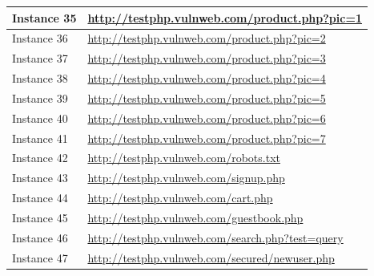 \documentclass[12pt]{article}
\begin{document}
\begin{center}
\begin{longtable}{|l|p{10cm}|}
\hline
Instance 35 & \url{http://testphp.vulnweb.com/product.php?pic=1} \\
\hline
Instance 36 & \url{http://testphp.vulnweb.com/product.php?pic=2} \\
\hline
Instance 37 & \url{http://testphp.vulnweb.com/product.php?pic=3} \\
\hline
Instance 38 & \url{http://testphp.vulnweb.com/product.php?pic=4} \\
\hline
Instance 39 & \url{http://testphp.vulnweb.com/product.php?pic=5} \\
\hline
Instance 40 & \url{http://testphp.vulnweb.com/product.php?pic=6} \\
\hline
Instance 41 & \url{http://testphp.vulnweb.com/product.php?pic=7} \\
\hline
Instance 42 & \url{http://testphp.vulnweb.com/robots.txt} \\
\hline
Instance 43 & \url{http://testphp.vulnweb.com/signup.php} \\
\hline
Instance 44 & \url{http://testphp.vulnweb.com/cart.php} \\
\hline
Instance 45 & \url{http://testphp.vulnweb.com/guestbook.php} \\
\hline
Instance 46 & \url{http://testphp.vulnweb.com/search.php?test=query} \\
\hline
Instance 47 & \url{http://testphp.vulnweb.com/secured/newuser.php} \\
\hline
\end{longtable}
\end{center}\vspace{0.7cm}
\vspace{0.7cm}
\end{document}
